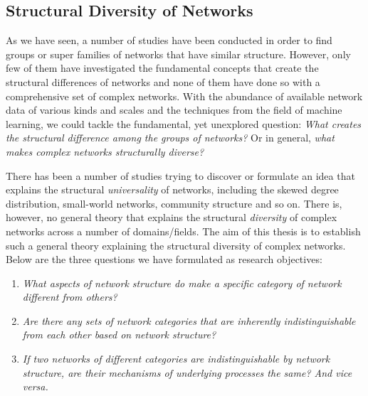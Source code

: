 	\subsection{Structural Diversity of Networks}
	As we have seen, a number of studies have been conducted in order to find groups or super families of networks that have similar structure. However, only few of them have investigated the fundamental concepts that create the structural differences of networks and none of them have done so with a comprehensive set of complex networks. With the abundance of available network data of various kinds and scales and the techniques from the field of machine learning, we could tackle the fundamental, yet unexplored question: \textit{What creates the structural difference among the groups of networks? } Or in general, \textit{what makes complex networks structurally diverse?} 
	
	 There has been a number of studies trying to discover or formulate an idea that explains the structural \textit{universality} of networks, including the skewed degree distribution, small-world networks, community structure and so on. There is, however, no general theory that explains the structural \textit{diversity} of complex networks across a number of domains/fields. The aim of  this thesis is to establish such a general theory explaining the structural diversity of complex networks. Below are the three  questions we have formulated as research objectives:

\begin{enumerate}
	\item \textit{What aspects of network structure do make a specific category of network different from others?}
	\item \textit{Are there any sets of network categories that are inherently indistinguishable from each other based on network structure?} 
	\item \textit{If two networks of different categories are indistinguishable by network structure, are their mechanisms of underlying processes the same? And vice versa.}
\end{enumerate}


